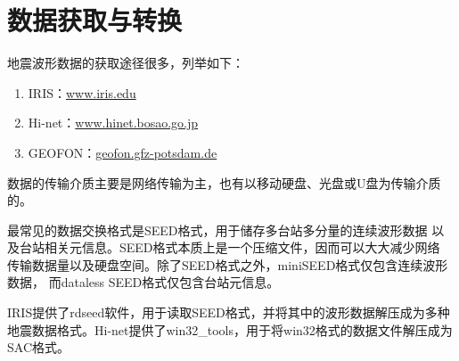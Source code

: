 \section{数据获取与转换}
地震波形数据的获取途径很多，列举如下：
\begin{enumerate}
\item IRIS：\url{www.iris.edu}
\item Hi-net：\url{www.hinet.bosao.go.jp}
\item GEOFON：\url{geofon.gfz-potsdam.de}
\end{enumerate}

数据的传输介质主要是网络传输为主，也有以移动硬盘、光盘或U盘为传输介质的。

最常见的数据交换格式是SEED格式，用于储存多台站多分量的连续波形数据
以及台站相关元信息。SEED格式本质上是一个压缩文件，因而可以大大减少网络
传输数据量以及硬盘空间。除了SEED格式之外，miniSEED格式仅包含连续波形数据，
而dataless SEED格式仅包含台站元信息。

IRIS提供了rdseed软件，用于读取SEED格式，并将其中的波形数据解压成为多种
地震数据格式。Hi-net提供了win32\_tools，用于将win32格式的数据文件解压成为SAC格式。